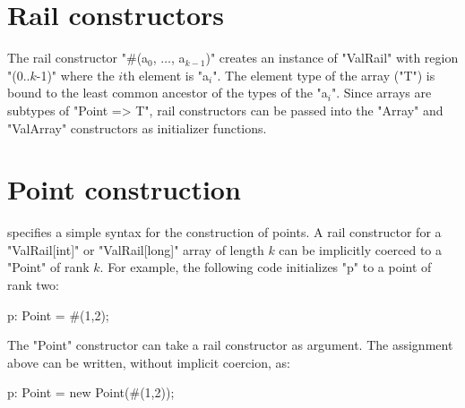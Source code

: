 \section{Rail constructors}
\label{RailConstructors}


The rail constructor \xcdmath"#(a$_0$, $\dots$, a$_{k-1}$)"
creates an instance of \xcd"ValRail" with region
\xcdmath"(0..$k$-1)" where the $i$th element is
\xcdmath"a$_i$".  The element type of the array (\xcd"T") is
bound to the least common ancestor of the types of the
\xcdmath"a$_i$".  Since arrays are subtypes of \xcd"Point => T",
rail constructors can be passed into the \xcd"Array" and
\xcd"ValArray" constructors as initializer functions.

\section{Point construction}\label{point-syntax}


\Xten{} specifies a simple syntax for the construction of points.
A rail constructor for a \xcd"ValRail[int]" or
\xcd"ValRail[long]" array of length $k$
can be implicitly coerced to a \xcd"Point" of rank $k$.  For
example, the following code initializes \xcd"p" to a point of
rank two:

\begin{xten}
p: Point = #(1,2);
\end{xten}

The \xcd"Point" constructor can take a rail constructor as
argument.  The assignment above can be written, without
implicit coercion, as:

\begin{xten}
p: Point = new Point(#(1,2));
\end{xten}


